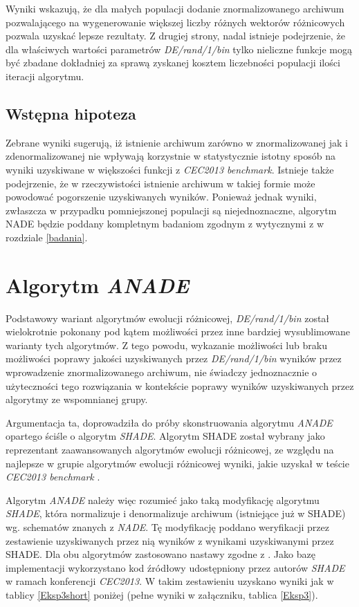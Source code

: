 \documentclass[12pt,a4paper]{report}
\begin{document}
{{{{{{\par{
Wyniki wskazują, że dla małych populacji dodanie znormalizowanego archiwum pozwalającego na wygenerowanie większej liczby różnych wektorów różnicowych pozwala uzyskać lepsze rezultaty. Z drugiej strony, nadal istnieje podejrzenie, że dla właściwych wartości parametrów \emph{DE/rand/1/bin} tylko nieliczne funkcje mogą być zbadane dokładniej za sprawą zyskanej kosztem liczebności populacji ilości iteracji algorytmu.
}
\subsection{Wstępna hipoteza}
\par{
Zebrane wyniki sugerują, iż istnienie archiwum zarówno w znormalizowanej jak i zdenormalizowanej nie wpływają korzystnie w statystycznie istotny sposób na wyniki uzyskiwane w większości funkcji z \emph{CEC2013 benchmark}. Istnieje także podejrzenie, że w rzeczywistości istnienie archiwum w takiej formie może powodować pogorszenie uzyskiwanych wyników. Ponieważ jednak wyniki, zwłaszcza w przypadku pomniejszonej populacji są niejednoznaczne, algorytm NADE będzie poddany kompletnym badaniom zgodnym z wytycznymi z \cite{Li13benchmarkfunctions} w rozdziale \ref{badania}.
}

\section{Algorytm \emph{ANADE}}
\label{ANADE}
\par{
Podstawowy wariant algorytmów ewolucji różnicowej, \emph{DE/rand/1/bin} został wielokrotnie pokonany pod kątem możliwości przez inne bardziej wysublimowane warianty tych algorytmów. Z tego powodu, wykazanie możliwości lub braku możliwości poprawy jakości uzyskiwanych przez \emph{DE/rand/1/bin} wyników przez wprowadzenie znormalizowanego archiwum, nie świadczy jednoznacznie o użyteczności tego rozwiązania w kontekście poprawy wyników uzyskiwanych przez algorytmy ze wspomnianej grupy.
}
\par{
Argumentacja ta, doprowadziła do próby skonstruowania algorytmu \emph{ANADE} opartego ściśle o algorytm \emph{SHADE}. Algorytm SHADE został wybrany jako reprezentant zaawansowanych algorytmów ewolucji różnicowej, ze względu na najlepsze w grupie algorytmów ewolucji różnicowej wyniki, jakie uzyskał w teście \emph{CEC2013 benchmark} \cite{CEC2013Comp}.
}
\par{
Algorytm \emph{ANADE} należy więc rozumieć jako taką modyfikację algorytmu \emph{SHADE}, która normalizuje i denormalizuje archiwum (istniejące już w SHADE) wg. schematów znanych z \emph{NADE}. Tę modyfikację poddano weryfikacji przez zestawienie uzyskiwanych przez nią wyników z wynikami uzyskiwanymi przez SHADE. Dla obu algorytmów zastosowano nastawy zgodne z \cite{SHADE}. Jako bazę implementacji wykorzystano kod źródłowy udostępniony przez autorów \emph{SHADE} w ramach konferencji \emph{CEC2013}. W takim zestawieniu uzyskano wyniki jak w tablicy \ref{Eksp3short} poniżej (pełne wyniki w załączniku, tablica \ref{Eksp3}).
}

}}}}}}
\end{document}
